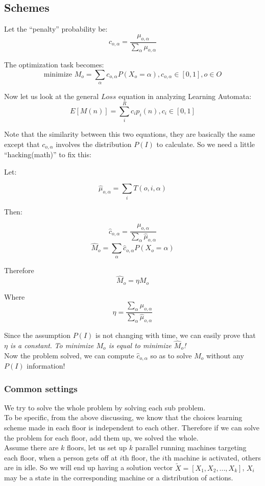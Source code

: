 \documentclass[11pt]{article}
\begin{document}
\subsection{Schemes}
Let the ``penalty'' probability be:
$$c_{o,\alpha}=\frac{\mu_{o,\alpha}}{\sum_\alpha\mu_{o,\alpha}}$$

The optimization task becomes:
$$\text{minimize } M_o=\sum_\alpha c_{o,\alpha} P(X_o=\alpha),c_{o,\alpha} \in [0,1], o \in O$$

Now let us look at the general $Loss$ equation in analyzing Learning Automata:
$$E[M(n)]=\sum_i^R c_i p_i(n),c_i \in [0,1]$$

Note that the similarity between this two equations, they are basically the same except that $c_{o,\alpha}$ involves the distribution $P(I)$ to calculate. So we need a little ``hacking(math)'' to fix this:

Let:

$$\hat{\mu}_{o,\alpha}=\sum_iT(o,i,\alpha)$$

Then:

$$\hat{c}_{o,\alpha}=\frac{\mu_{o,\alpha}}{\sum_\alpha\hat{\mu}_{o,\alpha}}$$
$$\hat{M}_o=\sum_\alpha \hat{c}_{o,\alpha} P(X_o=\alpha)$$

Therefore
$$\hat{M}_o=\eta M_o$$

Where
$$\eta=\frac{\sum_\alpha\mu_{o,\alpha}}{\sum_\alpha\hat{\mu}_{o,\alpha}}$$


Since the assumption $P(I)$ is not changing with time, we can easily prove that \emph{$\eta$ is a constant}. \emph{To minimize $M_o$ is equal to minimize $\hat{M}_o$!}\\

Now the problem solved, we can compute $\hat{c}_{o,\alpha}$ so as to solve $M_o$ without any $P(I)$ information!\\

\subsubsection{Common settings}
We try to solve the whole problem by solving each sub problem.\\

To be specific, from the above discussing, we know that the choices learning scheme made in each floor is independent to each other. Therefore if we can solve the problem for each floor, add them up, we solved the whole.\\

Assume there are $k$ floors, let us set up $k$ parallel running machines targeting each floor, when a person gets off at $i$th floor, the $i$th machine is activated, others are in idle. So we will end up having a solution vector $\tilde{X}=[X_1,X_2,...,X_k]$, $X_i$ may be a state in the corresponding machine or a distribution of actions.\\
\end{document}
